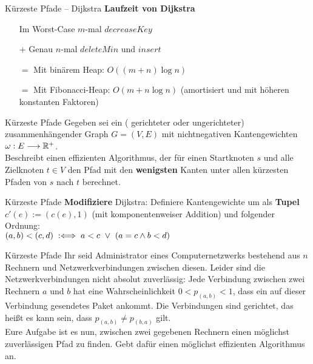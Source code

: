\begin{frame}{Kürzeste Pfade – Dijkstra}
	\textbf{Laufzeit von Dijkstra} 
	\begin{itemize}
		\item[] Im Worst-Case $m$-mal $decreaseKey$
		\item[$+$] Genau $n$-mal $deleteMin$ und $insert$
		\pause
		\item[$=$] Mit binärem Heap: $O\left((m+n)\log n\right)$
		\pause
		\item[$=$] Mit Fibonacci-Heap: $O(m + n \log n)$ \quad (amortisiert und mit höheren konstanten Faktoren)
	\end{itemize}
\end{frame}

\begin{frame}{Kürzeste Pfade}
	Gegeben sei ein ( gerichteter oder ungerichteter) zusammenhängender Graph $G = (V, E)$ mit nichtnegativen Kantengewichten $\omega : E \longrightarrow \mathbb{R}^{+}$. \\
	\smallskip
	 Beschreibt einen effizienten Algorithmus, der für einen Startknoten $s$ und alle Zielknoten $t \in V$ den Pfad mit den \textbf{wenigsten} Kanten unter allen kürzesten Pfaden von $s$ nach $t$ berechnet.
\end{frame}

\begin{frame}{Kürzeste Pfade}
	\solutionheading
	\textbf{Modifiziere} Dijkstra: Definiere Kantengewichte um als \textbf{Tupel} $c'(e) := \left(c(e), 1\right)$ (mit komponentenweiser Addition) und folgender Ordnung: \\ $(a, b) < (c, d) \Gdwdef a < c \ \lor\  (a = c \land b < d)$ 
\end{frame}

\begin{frame}{Kürzeste Pfade}
	Ihr seid Administrator eines Computernetzwerks bestehend aus $n$ Rechnern und Netzwerkverbindungen
	zwischen diesen. Leider sind die Netzwerkverbindungen nicht absolut zuverlässig: Jede Verbindung
	zwischen zwei Rechnern $a$ und $b$ hat eine Wahrscheinlichkeit $0 < p_{(a,b)} < 1$, dass ein auf dieser
	Verbindung gesendetes Paket ankommt. Die Verbindungen sind gerichtet, das heißt es kann sein,
	dass $p_{(a,b)} \neq p_{(b,a)}$ gilt. \\
	\medskip
	Eure Aufgabe ist es nun, zwischen zwei gegebenen Rechnern einen möglichst zuverlässigen Pfad zu finden.
	Gebt dafür einen möglichst effizienten Algorithmus an.
\end{frame}

